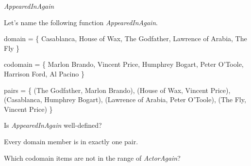 \documentclass{ximera}
\begin{document}
\begin{example} \textit{AppearedInAgain}

Let's name the following function \textit{AppearedInAgain}.

domain = \{ Casablanca, House of Wax,  The Godfather, Lawrence of Arabia, The Fly \}

codomain = \{ Marlon Brando, Vincent Price, Humphrey Bogart, Peter O'Toole, Harrison Ford, Al Pacino \}

pairs = \{ (The Godfather, Marlon Brando), (House of Wax, Vincent Price), (Casablanca, Humphrey Bogart), (Lawrence of Arabia, Peter O'Toole), (The Fly, Vincent Price) \} 





\begin{question}

Is \textit{AppearedInAgain} well-defined?

\begin{multipleChoice}
\end{multipleChoice}
\begin{feedback}
Every domain member is in exactly one pair.
\end{feedback}

\end{question}







\begin{question}

Which codomain items are not in the range of \textit{ActorAgain}?

\begin{selectAll}
\end{selectAll}

\end{question}





\end{example}
\end{document}
